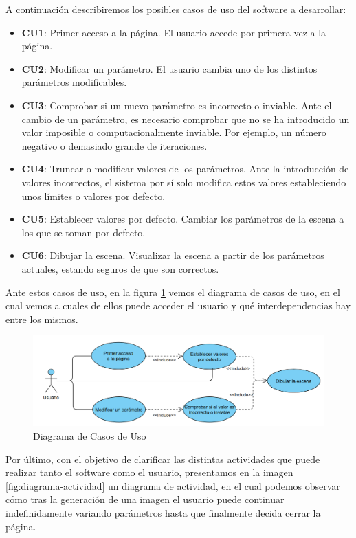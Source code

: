A continuación describiremos los posibles casos de uso del software a desarrollar:
\begin{itemize}
    \item \textbf{CU1}: Primer acceso a la página. El usuario accede por primera vez a la página.
    \item \textbf{CU2}: Modificar un parámetro. El usuario cambia uno de los distintos parámetros modificables.
    \item \textbf{CU3}: Comprobar si un nuevo parámetro es incorrecto o inviable. Ante el cambio de un parámetro, es necesario comprobar que no se ha introducido un valor imposible o computacionalmente inviable. Por ejemplo, un número negativo o demasiado grande de iteraciones.
    \item \textbf{CU4}: Truncar o modificar valores de los parámetros. Ante la introducción de valores incorrectos, el sistema por sí solo modifica estos valores estableciendo unos límites o valores por defecto.
    \item \textbf{CU5}: Establecer valores por defecto. Cambiar los parámetros de la escena a los que se toman por defecto.
    \item \textbf{CU6}: Dibujar la escena. Visualizar la escena a partir de los parámetros actuales, estando seguros de que son correctos.
\end{itemize}

Ante estos casos de uso, en la figura \ref{fig:casos-uso} vemos el diagrama de casos de uso, en el cual vemos a cuales de ellos puede acceder el usuario y qué interdependencias hay entre los mismos.

\begin{figure} [ht]
\centering
\includegraphics[width=15cm]{img/C6/diagrama-CU.png}
\caption{Diagrama de Casos de Uso}
    \label{fig:casos-uso}
\end{figure}

Por último, con el objetivo de clarificar las distintas actividades que puede realizar tanto el software como el usuario, presentamos en la imagen \ref{fig:diagrama-actividad} un diagrama de actividad, en el cual podemos observar cómo tras la generación de una imagen el usuario puede continuar indefinidamente variando parámetros hasta que finalmente decida cerrar la página.

